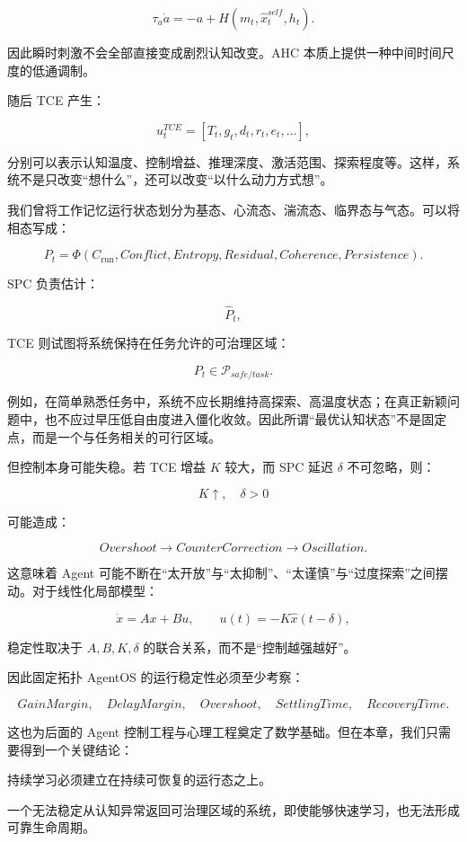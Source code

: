 \[
\tau_a\dot a
=
-a
+
H(m_t,\hat{x}^{self}_t,h_t).
\]

因此瞬时刺激不会全部直接变成剧烈认知改变。AHC 本质上提供一种中间时间尺度的低通调制。

随后 TCE 产生：

\[
u_t^{TCE}
=
[
T_t,
g_t,
d_t,
r_t,
e_t,\ldots
],
\]

分别可以表示认知温度、控制增益、推理深度、激活范围、探索程度等。这样，系统不是只改变“想什么”，还可以改变“以什么动力方式想”。

我们曾将工作记忆运行状态划分为基态、心流态、湍流态、临界态与气态。可以将相态写成：

\[
P_t
=
\Phi
\left(
C_{\mathrm{run}},
Conflict,
Entropy,
Residual,
Coherence,
Persistence
\right).
\]

SPC 负责估计：

\[
\hat P_t,
\]

TCE 则试图将系统保持在任务允许的可治理区域：

\[
P_t
\in
\mathcal{P}_{safe/task}.
\]

例如，在简单熟悉任务中，系统不应长期维持高探索、高温度状态；在真正新颖问题中，也不应过早压低自由度进入僵化收敛。因此所谓“最优认知状态”不是固定点，而是一个与任务相关的可行区域。

但控制本身可能失稳。若 TCE 增益 $K$ 较大，而 SPC 延迟 $\delta$ 不可忽略，则：

\[
K\uparrow,
\quad
\delta>0
\]

可能造成：

\[
Overshoot
\rightarrow
CounterCorrection
\rightarrow
Oscillation.
\]

这意味着 Agent 可能不断在“太开放”与“太抑制”、“太谨慎”与“过度探索”之间摆动。对于线性化局部模型：

\[
\dot x
=
Ax+Bu,
\qquad
u(t)
=
-K\hat x(t-\delta),
\]

稳定性取决于 $A,B,K,\delta$ 的联合关系，而不是“控制越强越好”。

因此固定拓扑 AgentOS 的运行稳定性必须至少考察：

\[
GainMargin,
\quad
DelayMargin,
\quad
Overshoot,
\quad
SettlingTime,
\quad
RecoveryTime.
\]

这也为后面的 Agent 控制工程与心理工程奠定了数学基础。但在本章，我们只需要得到一个关键结论：

\begin{conclusion}
持续学习必须建立在持续可恢复的运行态之上。
\end{conclusion}

一个无法稳定从认知异常返回可治理区域的系统，即使能够快速学习，也无法形成可靠生命周期。

